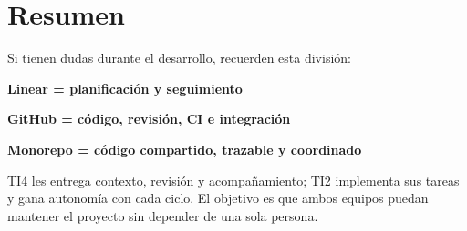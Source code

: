 \documentclass[11pt,a4paper]{article}
\begin{document}

\section{Resumen}

Si tienen dudas durante el desarrollo, recuerden esta división:

\begin{center}
  \textbf{Linear = planificación y seguimiento}
\end{center}

\begin{center}
  \textbf{GitHub = código, revisión, CI e integración}
\end{center}

\begin{center}
  \textbf{Monorepo = código compartido, trazable y coordinado}
\end{center}

TI4 les entrega contexto, revisión y acompañamiento; TI2 implementa sus tareas
y gana autonomía con cada ciclo. El objetivo es que ambos equipos puedan
mantener el proyecto sin depender de una sola persona.
\end{document}
